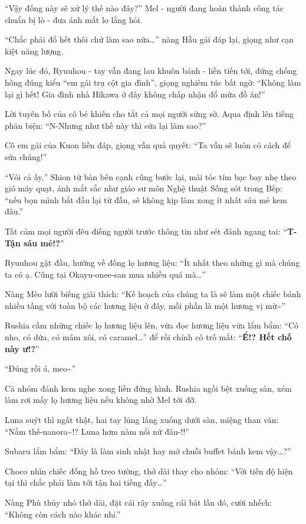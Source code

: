 \documentclass[../main.tex]{subfiles}
\begin{document}
``Vậy đống này sẽ xử lý thế nào đây?'' Mel - người đang hoàn thành công tác chuẩn bị lò - đưa ánh mắt lo lắng hỏi.

``Chắc phải đổ hết thôi chứ làm sao nữa\dots'' nàng Hầu gái đáp lại, giọng như cạn kiệt năng lượng.

Ngay lúc đó, Ryuuhou - tay vẫn đang lau khuôn bánh - liền tiến tới, đứng chống hông đúng kiểu ``em gái trụ cột gia đình'', giọng nghiêm túc bất ngờ: ``Không làm lại gì hết! Gia đình nhà Hikawa ở đây không chấp nhận đổ mứa đồ ăn!''

Lời tuyên bố của cô bé khiến cho tắt cả mọi người sững sờ. Aqua định lên tiếng phản biện: ``N-Nhưng như thế này thì sửa lại làm sao?''

Cô em gái của Kuon liền đáp, giọng vẫn quả quyết: ``Ta vẫn sẽ luôn có cách để sửa chúng!''

``Vói cả ấy,'' Shion từ bàn bên cạnh cũng bước lại, mái tóc tím bạc bay nhẹ theo gió máy quạt, ánh mắt sắc như giáo sư môn Nghệ thuật Sống sót trong Bếp: ``nếu bọn mình bắt đầu lại từ đầu, sẽ không kịp làm xong ít nhất sáu mẻ kem đâu.''

Tất cảm mọi người đêu điếng người trước thông tin như sét đánh ngang tai: ``\textbf{T-Tận sáu mẻ!?}''

Ryuuhou gật đầu, hướng về đống lọ hương liệu: ``Ít nhất theo những gì mà chúng ta có ạ. Cũng tại Okayu-onee-san mua nhiều quá mà\dots''

Nàng Mèo lười biếng giải thích: ``Kế hoạch của chúng ta là sẽ làm một chiếc bánh nhiều tầng với toàn bộ các hương liệu ở đây, mỗi phần là một hương vị mừ\~{}''

Rushia cầm những chiếc lọ hương liệu lên, vừa đọc hương liệu vừa lẩm bẩm: ``Có nho, có dứa, có mâm xôi, có caramel\dots'' để rồi chính cô trố mắt: ``\textbf{Ể!? Hết chỗ này ư!?}''

``Đúng rồi á, meo\~{}''

Cả nhóm đánh kem nghe xong liền đứng hình. Rushia ngồi bệt xuống sàn, xém làm rơi mấy lọ hương liệu nếu không nhờ Mel tới đỡ.

Luna suýt thì ngất thật, hai tay lủng lẳng xuống dưới sàn, miệng than vãn: ``Nắm thế-nanora\~{}!? Luna hơm nàm nổi nữ đâu-!!''

Subaru lẩm bẩm: ``Đây là làm sinh nhật hay mở chuỗi buffet bánh kem vậy\dots?''

Choco nhìn chiếc đồng hồ treo tường, thở dài thay cho nhóm: ``Với tiến độ hiện tại thì chắc phải làm tới tận hai tiếng đấy\dots''

Nàng Phù thủy nhỏ thở dài, đặt cái rây xuống cái bát lần đó, cười nhếch: ``Không còn cách nào khác nhỉ.''
\end{document}
